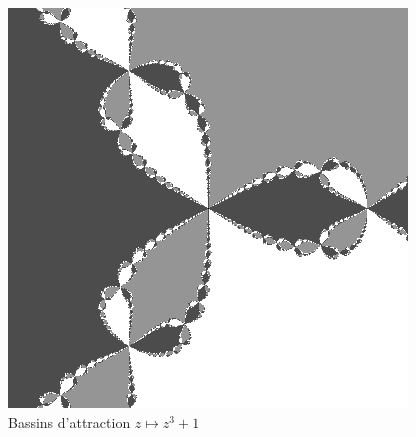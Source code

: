 \documentclass[
  11pt,
]{article}
\begin{document}
\begin{figure}
\centering
\includegraphics{fractale-z3+1-L.png}
\caption{Bassins d'attraction \(z \mapsto z^3+1\)}
\end{figure}

\begin{lstlisting}[language=Python]
\end{lstlisting}
\end{document}
